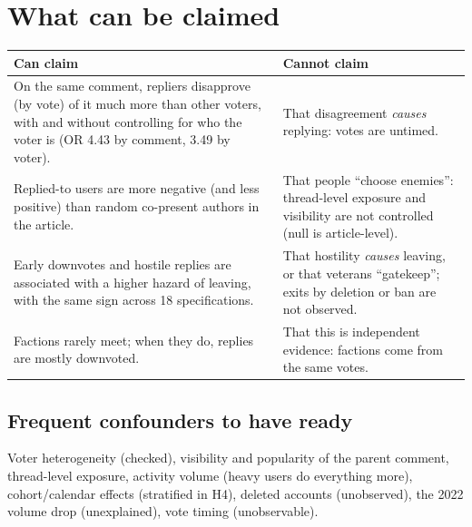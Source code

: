 \documentclass[11pt,a4paper]{article}
\begin{document}
\section{What can be claimed}\label{sec:claims}
\begin{tabularx}{\textwidth}{@{}Y Y@{}}
\toprule
Can claim & Cannot claim \\
\midrule
On the same comment, repliers disapprove (by vote) of it much more than other voters, with and without controlling for who the voter is (OR 4.43 by comment, 3.49 by voter). & That disagreement \emph{causes} replying: votes are untimed. \\
Replied-to users are more negative (and less positive) than random co-present authors in the article. & That people ``choose enemies'': thread-level exposure and visibility are not controlled (null is article-level). \\
Early downvotes and hostile replies are associated with a higher hazard of leaving, with the same sign across 18 specifications. & That hostility \emph{causes} leaving, or that veterans ``gatekeep''; exits by deletion or ban are not observed. \\
Factions rarely meet; when they do, replies are mostly downvoted. & That this is independent evidence: factions come from the same votes. \\
\bottomrule
\end{tabularx}

\subsection*{Frequent confounders to have ready}
Voter heterogeneity (checked), visibility and popularity of the parent comment, thread-level exposure, activity volume (heavy users do everything more), cohort/calendar effects (stratified in H4), deleted accounts (unobserved), the 2022 volume drop (unexplained), vote timing (unobservable).

\end{document}
